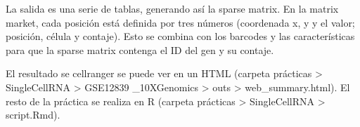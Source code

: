 La salida es una serie de tablas, generando así la sparse matrix. En la matrix market, cada posición está definida por tres números (coordenada x, y y el valor; posición, célula y contaje). Esto se combina con los barcodes y las características para que la sparse matrix contenga el ID del gen y su contaje. 

El resultado se cellranger se puede ver en un HTML (carpeta prácticas > SingleCellRNA > GSE12839 \_10XGenomics > outs > web\_summary.html). El resto de la práctica se realiza en R (carpeta prácticas > SingleCellRNA > script.Rmd).




